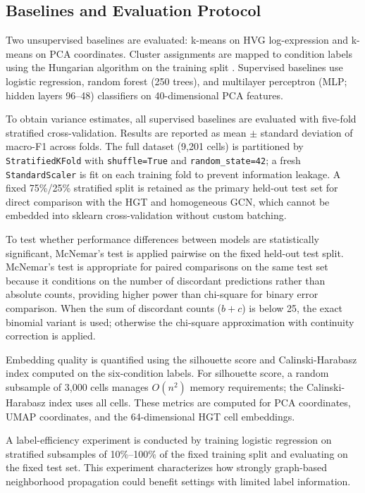 \subsection{Baselines and Evaluation Protocol}

Two unsupervised baselines are evaluated: k-means on HVG log-expression and
k-means on PCA coordinates.
Cluster assignments are mapped to condition labels using the Hungarian algorithm
on the training split \citep{luecken2022benchmarking}.
Supervised baselines use logistic regression, random forest (250 trees), and
multilayer perceptron (MLP; hidden layers 96--48) classifiers on 40-dimensional
PCA features.

To obtain variance estimates, all supervised baselines are evaluated with
five-fold stratified cross-validation.
Results are reported as mean $\pm$ standard deviation of macro-F1 across folds.
The full dataset (9,201 cells) is partitioned by \texttt{StratifiedKFold} with
\texttt{shuffle=True} and \texttt{random\_state=42}; a fresh \texttt{StandardScaler}
is fit on each training fold to prevent information leakage.
A fixed 75\%/25\% stratified split is retained as the primary held-out test set
for direct comparison with the HGT and homogeneous GCN, which cannot be embedded
into sklearn cross-validation without custom batching.

To test whether performance differences between models are statistically
significant, McNemar's test \citep{mcnemar1947} is applied pairwise on the
fixed held-out test split.
McNemar's test is appropriate for paired comparisons on the same test set because
it conditions on the number of discordant predictions rather than absolute counts,
providing higher power than chi-square for binary error comparison.
When the sum of discordant counts ($b+c$) is below 25, the exact binomial
variant is used; otherwise the chi-square approximation with continuity correction
is applied.

Embedding quality is quantified using the silhouette score
\citep{rousseeuw1987silhouette} and Calinski-Harabasz index
\citep{calinski1974dendrite} computed on the six-condition labels.
For silhouette score, a random subsample of 3,000 cells manages $O(n^2)$ memory
requirements; the Calinski-Harabasz index uses all cells.
These metrics are computed for PCA coordinates, UMAP coordinates, and the
64-dimensional HGT cell embeddings.

A label-efficiency experiment is conducted by training logistic regression on
stratified subsamples of 10\%--100\% of the fixed training split and evaluating
on the fixed test set.
This experiment characterizes how strongly graph-based neighborhood propagation
could benefit settings with limited label information.

